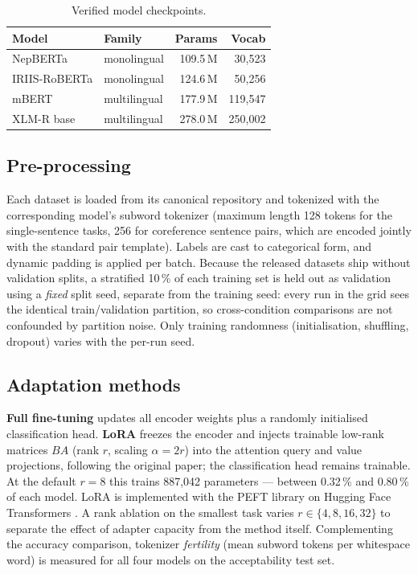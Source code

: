 \documentclass[11pt,a4paper]{article}
\begin{document}
\begin{table}[t]
  \centering
  \caption{Verified model checkpoints.}
  \label{tab:models}
  \begin{tabular}{llrr}
    \toprule
    Model & Family & Params & Vocab \\
    \midrule
    NepBERTa      & monolingual  & 109.5\,M & 30{,}523 \\
    IRIIS-RoBERTa & monolingual  & 124.6\,M & 50{,}256 \\
    mBERT         & multilingual & 177.9\,M & 119{,}547 \\
    XLM-R base    & multilingual & 278.0\,M & 250{,}002 \\
    \bottomrule
  \end{tabular}
\end{table}

\subsection{Pre-processing}

Each dataset is loaded from its canonical repository and tokenized with
the corresponding model's subword tokenizer (maximum length 128 tokens
for the single-sentence tasks, 256 for coreference sentence pairs, which
are encoded jointly with the standard pair template). Labels are cast to
categorical form, and dynamic padding is applied per batch. Because the
released datasets ship without validation splits, a stratified 10\,\% of
each training set is held out as validation using a \emph{fixed} split
seed, separate from the training seed: every run in the grid sees the
identical train/validation partition, so cross-condition comparisons are
not confounded by partition noise. Only training randomness
(initialisation, shuffling, dropout) varies with the per-run seed.

\subsection{Adaptation methods}

\textbf{Full fine-tuning} updates all encoder weights plus a randomly
initialised classification head. \textbf{LoRA} \citep{hu2022lora} freezes
the encoder and injects trainable low-rank matrices $BA$ (rank $r$,
scaling $\alpha = 2r$) into the attention query and value projections,
following the original paper; the classification head remains trainable.
At the default $r{=}8$ this trains 887{,}042 parameters --- between
0.32\,\% and 0.80\,\% of each model. LoRA is implemented with the PEFT
library \citep{mangrulkar2022peft} on Hugging Face Transformers
\citep{wolf2020transformers}. A rank ablation on the smallest task varies
$r \in \{4, 8, 16, 32\}$ to separate the effect of adapter capacity from
the method itself. Complementing the accuracy comparison, tokenizer
\emph{fertility} (mean subword tokens per whitespace word) is measured
for all four models on the acceptability test set.
\end{document}
